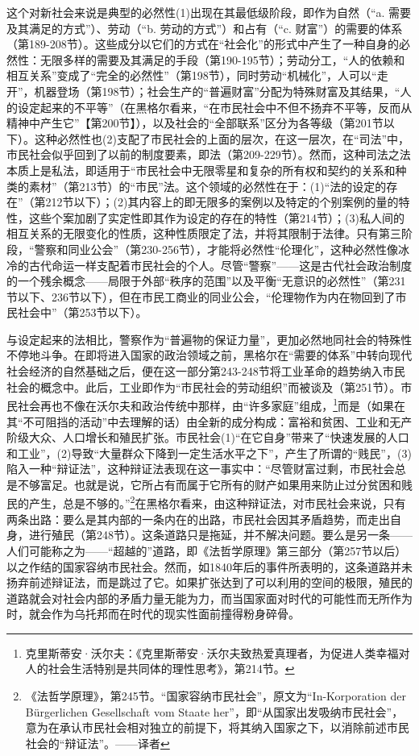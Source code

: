 这个对新社会来说是典型的必然性(1)出现在其最低级阶段，即作为自然（“a. 需要及其满足的方式”）、劳动（“b. 劳动的方式”）和占有（“c. 财富”）的需要的体系（第189-208节）。这些成分以它们的方式在“社会化”的形式中产生了一种自身的必然性：无限多样的需要及其满足的手段（第190-195节）；劳动分工，“人的依赖和相互关系”变成了“完全的必然性”（第198节），同时劳动“机械化”，人可以“走开”，机器登场（第198节）；社会生产的“普遍财富”分配为特殊财富及其结果，“人的设定起来的不平等”（在黑格尔看来，“在市民社会中不但不扬弃不平等，反而从精神中产生它”【第200节】），以及社会的“全部联系”区分为各等级（第201节以下）。这种必然性也(2)支配了市民社会的上面的层次，在这一层次，在“司法”中，市民社会似乎回到了以前的制度要素，即法（第209-229节）。然而，这种司法之法本质上是私法，即适用于“市民社会中无限零星和复杂的所有权和契约的关系和种类的素材”（第213节）的“市民”法。这个领域的必然性在于：(1)“法的设定的存在”（第212节以下）；(2)其内容上的即无限多的案例以及特定的个别案例的量的特性，这些个案加剧了实定性即其作为设定的存在的特性（第214节）；(3)私人间的相互关系的无限变化的性质，这种性质限定了法，并将其限制于法律。只有第三阶段，“警察和同业公会”（第230-256节），才能将必然性“伦理化”，这种必然性像冰冷的古代命运一样支配着市民社会的个人。尽管“警察”——这是古代社会政治制度的一个残余概念——局限于外部“秩序的范围”以及平衡“无意识的必然性”（第231节以下、236节以下），但在市民工商业的同业公会，“伦理物作为内在物回到了市民社会中”（第253节以下）。

与设定起来的法相比，警察作为“普遍物的保证力量”，更加必然地同社会的特殊性不停地斗争。在即将进入国家的政治领域之前，黑格尔在“需要的体系”中转向现代社会经济的自然基础之后，便在这一部分第243-248节将工业革命的趋势纳入市民社会的概念中。此后，工业即作为“市民社会的劳动组织”而被谈及（第251节）。市民社会再也不像在沃尔夫和政治传统中那样，由“许多家庭”组成，\footnote{克里斯蒂安·沃尔夫：《克里斯蒂安·沃尔夫致热爱真理者，为促进人类幸福对人的社会生活特别是共同体的理性思考》，第214节。}而是（如果在其“不可阻挡的活动”中去理解的话）由全新的成分构成：富裕和贫困、工业和无产阶级大众、人口增长和殖民扩张。市民社会(1)“在它自身”带来了“快速发展的人口和工业”，(2)导致“大量群众下降到一定生活水平之下”，产生了所谓的“贱民”，(3)陷入一种“辩证法”，这种辩证法表现在这一事实中：“尽管财富过剩，市民社会总是不够富足。也就是说，它所占有而属于它所有的财产如果用来防止过分贫困和贱民的产生，总是不够的。”\footnote{《法哲学原理》，第245节。“国家容纳市民社会”，原文为“In-Korporation der Bürgerlichen Gesellschaft vom Staate her”，即“从国家出发吸纳市民社会”，意为在承认市民社会相对独立的前提下，将其纳入国家之下，以消除前述市民社会的“辩证法”。——译者}在黑格尔看来，由这种辩证法，对市民社会来说，只有两条出路：要么是其内部的一条内在的出路，市民社会因其矛盾趋势，而走出自身，进行殖民（第248节）。这条道路只是拖延，并不解决问题。要么是另一条——人们可能称之为——“超越的”道路，即《法哲学原理》第三部分（第257节以后）以之作结的国家容纳市民社会。然而，如1840年后的事件所表明的，这条道路并未扬弃前述辩证法，而是跳过了它。如果扩张达到了可以利用的空间的极限，殖民的道路就会对社会内部的矛盾力量无能为力，而当国家面对时代的可能性而无所作为时，就会作为乌托邦而在时代的现实性面前撞得粉身碎骨。

